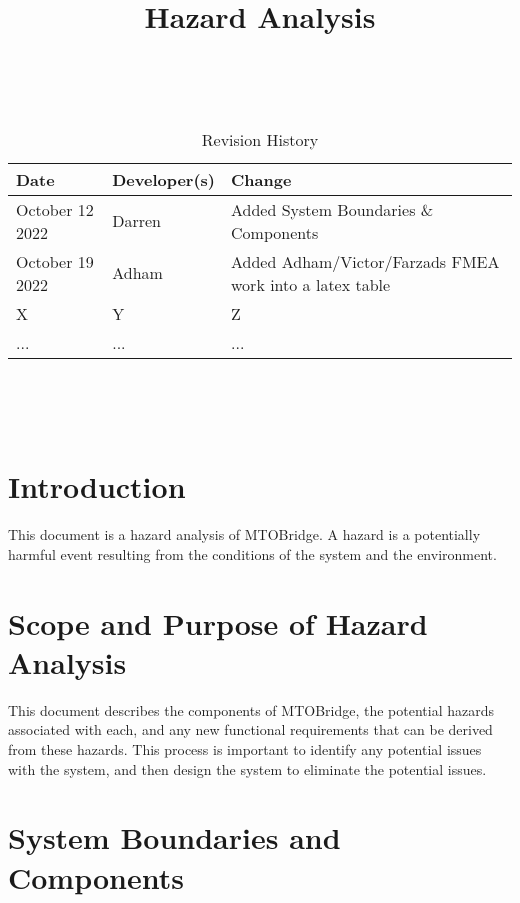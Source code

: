 \documentclass{article}
\title{Hazard Analysis\\\progname}
\author{\authname}
\date{}
\begin{document}
\maketitle
\thispagestyle{empty}

~\newpage


\begin{table}[hp]
\caption{Revision History} \label{TblRevisionHistory}
\begin{tabularx}{\textwidth}{llX}
\toprule
\textbf{Date} & \textbf{Developer(s)} & \textbf{Change}\\
\midrule
October 12 2022 & Darren & Added System Boundaries \& Components\\
October 19 2022& Adham & Added Adham/Victor/Farzads FMEA work into a latex table\\
X & Y & Z\\
... & ... & ...\\
\bottomrule
\end{tabularx}
\end{table}

~\newpage

\tableofcontents

~\newpage



\section{Introduction}

This document is a hazard analysis of MTOBridge. A hazard is a potentially harmful event resulting
from the conditions of the system and the environment.

\section{Scope and Purpose of Hazard Analysis}

This document describes the components of MTOBridge, the potential hazards associated with each, and 
any new functional requirements that can be derived from these hazards. This process is important to 
identify any potential issues with the system, and then design the system to eliminate the potential issues.

\section{System Boundaries and Components}
\end{document}
